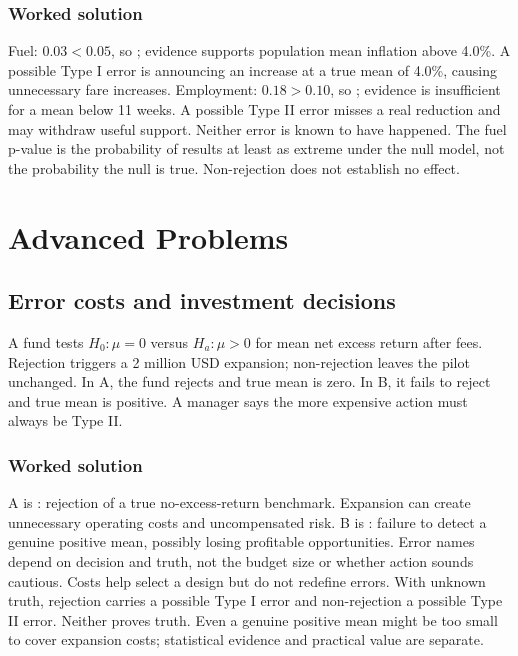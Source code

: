 \subsubsection*{Worked solution}\label{sol:reports}
Fuel: $0.03<0.05$, so ; evidence supports population mean inflation above 4.0\%. A possible Type I error is announcing an increase at a true mean of 4.0\%, causing unnecessary fare increases. Employment: $0.18>0.10$, so ; evidence is insufficient for a mean below 11 weeks. A possible Type II error misses a real reduction and may withdraw useful support. Neither error is known to have happened. The fuel p-value is the probability of results at least as extreme under the null model, not the probability the null is true. Non-rejection does not establish no effect.
\section{Advanced Problems}\label{sec:advanced}
\subsection{Error costs and investment decisions}\label{prob:costs}
A fund tests $H_0:\mu=0$ versus $H_a:\mu>0$ for mean net excess return after fees. Rejection triggers a 2 million USD expansion; non-rejection leaves the pilot unchanged. In A, the fund rejects and true mean is zero. In B, it fails to reject and true mean is positive. A manager says the more expensive action must always be Type II.
\subsubsection*{Worked solution}\label{sol:costs}
A is : rejection of a true no-excess-return benchmark. Expansion can create unnecessary operating costs and uncompensated risk. B is : failure to detect a genuine positive mean, possibly losing profitable opportunities. Error names depend on decision and truth, not the budget size or whether action sounds cautious. Costs help select a design but do not redefine errors. With unknown truth, rejection carries a possible Type I error and non-rejection a possible Type II error. Neither proves truth. Even a genuine positive mean might be too small to cover expansion costs; statistical evidence and practical value are separate.


